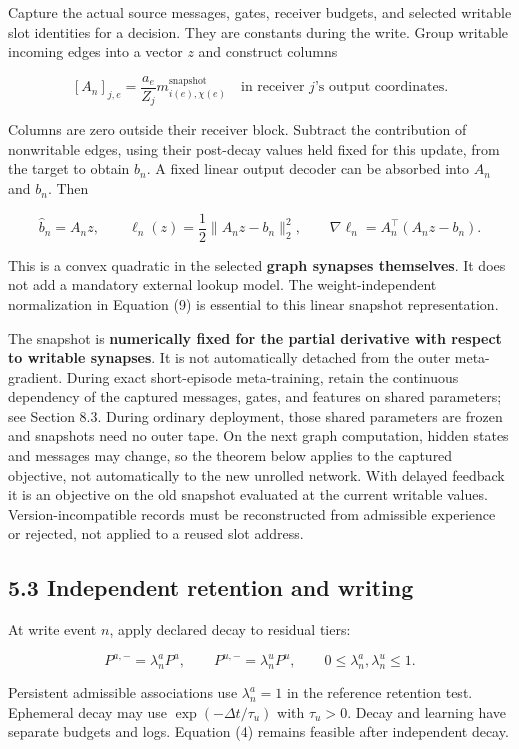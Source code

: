 \documentclass[
  11pt,
  a4paper,
]{article}
\begin{document}
Capture the actual source messages, gates, receiver budgets, and
selected writable slot identities for a decision. They are constants
during the write. Group writable incoming edges into a vector \(z\) and
construct columns

\[
[A_n]_{j,e}=\frac{a_e}{Z_j}m_{i(e),\chi(e)}^{\mathrm{snapshot}}
\quad\text{in receiver }j\text{'s output coordinates}.
\tag{13}
\]

Columns are zero outside their receiver block. Subtract the contribution
of nonwritable edges, using their post-decay values held fixed for this
update, from the target to obtain \(b_n\). A fixed linear output decoder
can be absorbed into \(A_n\) and \(b_n\). Then

\[
\widehat b_n=A_nz,
\qquad
\ell_n(z)=\frac12\|A_nz-b_n\|_2^2,
\qquad
\nabla\ell_n=A_n^\top(A_nz-b_n).
\tag{14}
\]

This is a convex quadratic in the selected \textbf{graph synapses
themselves}. It does not add a mandatory external lookup model. The
weight-independent normalization in Equation (9) is essential to this
linear snapshot representation.

The snapshot is \textbf{numerically fixed for the partial derivative
with respect to writable synapses}. It is not automatically detached
from the outer meta-gradient. During exact short-episode meta-training,
retain the continuous dependency of the captured messages, gates, and
features on shared parameters; see Section 8.3. During ordinary
deployment, those shared parameters are frozen and snapshots need no
outer tape. On the next graph computation, hidden states and messages
may change, so the theorem below applies to the captured objective, not
automatically to the new unrolled network. With delayed feedback it is
an objective on the old snapshot evaluated at the current writable
values. Version-incompatible records must be reconstructed from
admissible experience or rejected, not applied to a reused slot address.

\subsection{5.3 Independent retention and
writing}\label{independent-retention-and-writing}

At write event \(n\), apply declared decay to residual tiers:

\[
P^{a,-}=\lambda_n^aP^a,\qquad
P^{u,-}=\lambda_n^uP^u,\qquad
0\le\lambda_n^a,\lambda_n^u\le1.
\tag{15}
\]

Persistent admissible associations use \(\lambda_n^a=1\) in the
reference retention test. Ephemeral decay may use
\(\exp(-\Delta t/\tau_u)\) with \(\tau_u>0\). Decay and learning have
separate budgets and logs. Equation (4) remains feasible after
independent decay.
\end{document}
